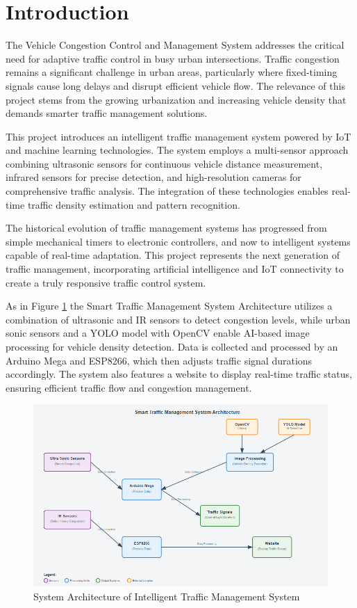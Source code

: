 \documentclass[12pt]{report}
\begin{document}
\section[Introduction]{\textbf{Introduction}}

The Vehicle Congestion Control and Management System addresses the critical need for adaptive traffic control in busy urban intersections. Traffic congestion remains a significant challenge in urban areas, particularly where fixed-timing signals cause long delays and disrupt efficient vehicle flow. The relevance of this project stems from the growing urbanization and increasing vehicle density that demands smarter traffic management solutions.

This project introduces an intelligent traffic management system powered by IoT and machine learning technologies. The system employs a multi-sensor approach combining ultrasonic sensors for continuous vehicle distance measurement, infrared sensors for precise detection, and high-resolution cameras for comprehensive traffic analysis. The integration of these technologies enables real-time traffic density estimation and pattern recognition.

The historical evolution of traffic management systems has progressed from simple mechanical timers to electronic controllers, and now to intelligent systems capable of real-time adaptation. This project represents the next generation of traffic management, incorporating artificial intelligence and IoT connectivity to create a truly responsive traffic control system.

As in Figure \ref{fig:system_architecture} the Smart Traffic Management System Architecture utilizes a combination of ultrasonic and IR sensors to detect congestion levels, while urban sonic sensors and a YOLO model with OpenCV enable AI-based image processing for vehicle density detection. Data is collected and processed by an Arduino Mega and ESP8266, which then adjusts traffic signal durations accordingly. The system also features a website to display real-time traffic status, ensuring efficient traffic flow and congestion management. 
\begin{figure}[htb]
\centering
	\includegraphics[scale=1]{Figures/system_architecture.png}	
	\caption{System Architecture of Intelligent Traffic Management System}
	\label{fig:system_architecture}
\end{figure}
\end{document}
